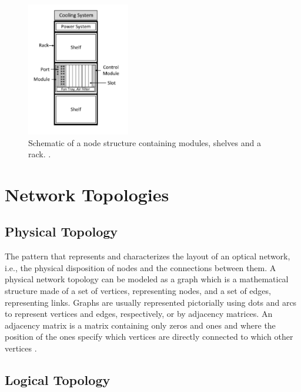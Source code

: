  \begin{figure}[H]
  \label{cisco}
  \begin{center}
    \includegraphics[width=0.40\textwidth]{fig/logos/node.pdf}
    \caption{Schematic of a node structure containing modules, shelves and a rack. \cite{6515886}.}
  \end{center}
\end{figure}



\clearpage

\section{Network Topologies}
\label{networkTopologies}

\subsection{Physical Topology}

The pattern that represents and characterizes the layout of an optical network, i.e., the physical disposition of nodes and the connections between them. A physical network topology can be modeled as a graph which is a mathematical structure made of a set of vertices, representing nodes, and a set of edges, representing links. Graphs are usually represented pictorially using dots and arcs to represent vertices and edges, respectively, or by adjacency matrices. An adjacency matrix is a matrix containing only zeros and ones and where the position of the ones specify which vertices are directly connected to which other vertices \cite{anpinto2}.  

\subsection{Logical Topology}

